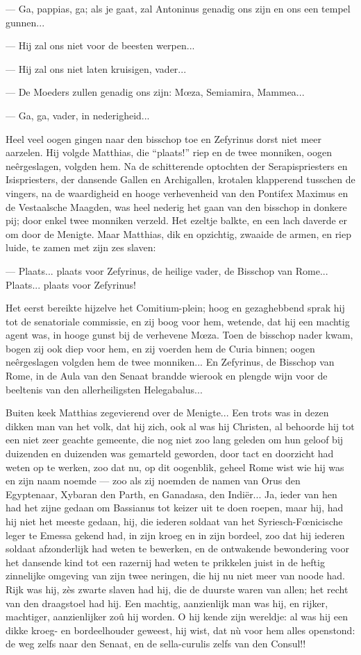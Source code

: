 \documentclass[a4paper, 12pt, oneside, dutch]{article}
\begin{document}
--- Ga, pappias, ga; als je gaat, zal Antoninus genadig ons zijn en ons een tempel gunnen...

--- Hij zal ons niet voor de beesten werpen...

--- Hij zal ons niet laten kruisigen, vader...

--- De Moeders zullen genadig ons zijn: Mœza, Semiamira, Mammea...

--- Ga, ga, vader, in nederigheid...

Heel veel oogen gingen naar den bisschop toe en Zefyrinus dorst niet meer aarzelen. Hij volgde Matthias, die "`plaats!"' riep en de twee monniken, oogen neêrgeslagen, volgden hem. Na de schitterende optochten der Serapispriesters en Isispriesters, der dansende Gallen en Archigallen, krotalen klapperend tusschen de vingers, na de waardigheid en hooge verhevenheid van den Pontifex Maximus en de Vestaalsche Maagden, was heel nederig het gaan van den bisschop in donkere pij; door enkel twee monniken verzeld. Het ezeltje balkte, en een lach daverde er om door de Menigte. Maar Matthias, dik en opzichtig, zwaaide de armen, en riep luide, te zamen met zijn zes slaven:

--- Plaats... plaats voor Zefyrinus, de heilige vader, de Bisschop van Rome... Plaats... plaats voor Zefyrinus!

Het eerst bereikte hijzelve het Comitium-plein; hoog en gezaghebbend sprak hij tot de senatoriale commissie, en zij boog voor hem, wetende, dat hij een machtig agent was, in hooge gunst bij de verhevene Mœza. Toen de bisschop nader kwam, bogen zij ook diep voor hem, en zij voerden hem de Curia binnen; oogen neêrgeslagen volgden hem de twee monniken... En Zefyrinus, de Bisschop van Rome, in de Aula van den Senaat brandde wierook en plengde wijn voor de beeltenis van den allerheiligsten Helegabalus...

Buiten keek Matthias zegevierend over de Menigte... Een trots was in dezen dikken man van het volk, dat hij zich, ook al was hij Christen, al behoorde hij tot een niet zeer geachte gemeente, die nog niet zoo lang geleden om hun geloof bij duizenden en duizenden was gemarteld geworden, door tact en doorzicht had weten op te werken, zoo dat nu, op dit oogenblik, geheel Rome wist wie hij was en zijn naam noemde --- zoo als zij noemden de namen van Orus den Egyptenaar, Xybaran den Parth, en Ganadasa, den Indiër... Ja, ieder van hen had het zijne gedaan om Bassianus tot keizer uit te doen roepen, maar hij, had hij niet het meeste gedaan, hij, die iederen soldaat van het Syriesch-Fœnicische leger te Emessa gekend had, in zijn kroeg en in zijn bordeel, zoo dat hij iederen soldaat afzonderlijk had weten te bewerken, en de ontwakende bewondering voor het dansende kind tot een razernij had weten te prikkelen juist in de heftig zinnelijke omgeving van zijn twee neringen, die hij nu niet meer van noode had. Rijk was hij, zès zwarte slaven had hij, die de duurste waren van allen; het recht van den draagstoel had hij. Een machtig, aanzienlijk man was hij, en rijker, machtiger, aanzienlijker zoû hij worden. O hij kende zijn wereldje: al was hij een dikke kroeg- en bordeelhouder geweest, hij wist, dat nù voor hem alles openstond: de weg zelfs naar den Senaat, en de sella-curulis zelfs van den Consul!!
\end{document}
